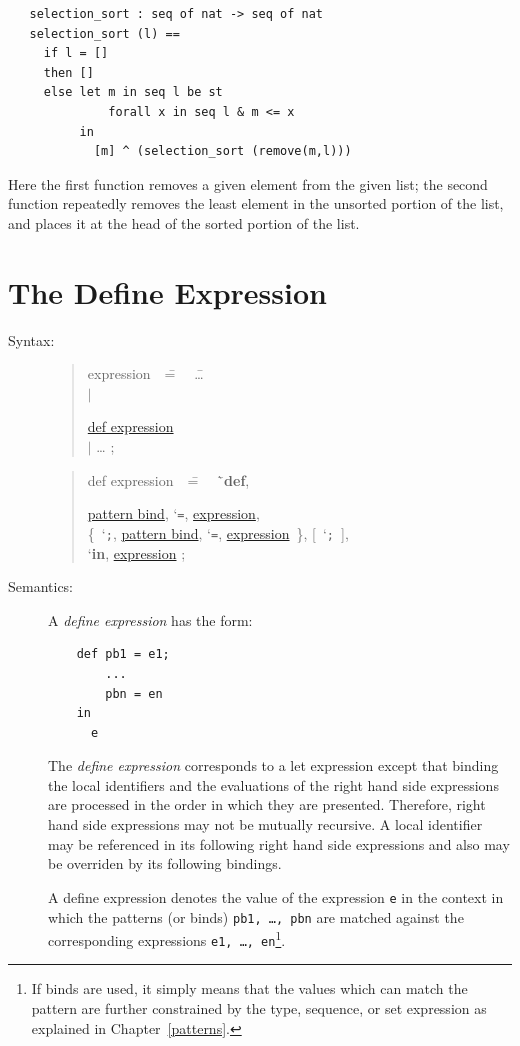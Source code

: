 \documentclass{overturerepchap}
\newcommand{\Lit}[1]{`{\tt #1}\Quote}
\newcommand{\Rule}[2]{
  \begin{quote}\begin{tabbing}
    #1\index{#1}\ \ \= = \ \ \= #2  ; %

  \end{tabbing}\end{quote}
  }
\newcommand{\Ruleref}[1]{
  \hyperlink{rule:#1}{#1}}
\newcommand{\SeqPt}[1]{\{\ #1\ \}}
\newcommand{\lfeed}{\\ \> \>}
\newcommand{\dsep}{\\ \> $|$ \>}
\newcommand{\Lop}[1]{`{\bf\ttfamily #1}\Quote}
\newcommand{\OptPt}[1]{[\ #1\ ]}
\begin{document}
{\begin{description}
\begin{lstlisting}
   selection_sort : seq of nat -> seq of nat
   selection_sort (l) ==
     if l = []
     then []
     else let m in seq l be st
              forall x in seq l & m <= x
          in
            [m] ^ (selection_sort (remove(m,l)))
   \end{lstlisting}
\label{selectionSortdef}
   Here the first function removes a given element from the given
   list; the second function repeatedly removes the least element in
   the unsorted portion of the list, and places it at the head of the
   sorted portion of the list.
\end{description}

\section{The Define Expression} \label{define-exp}

\begin{description}
\item[Syntax:]
  \Rule{expression}{
    \ldots \dsep
    \Ruleref{def expression} \dsep
    \ldots
    }

\Rule{def expression}{
  \Lop{def},
  \Ruleref{pattern bind}, \Lit{=}, \Ruleref{expression}, \lfeed
  \SeqPt{\Lit{;}, \Ruleref{pattern bind}, \Lit{=}, \Ruleref{expression}}, \OptPt{\Lit{;}},
  \lfeed
  \Lop{in}, \Ruleref{expression}
  }

\item[Semantics:] A {\it define expression} has the form:
  \begin{lstlisting}
    def pb1 = e1;
        ...
        pbn = en
    in
      e
  \end{lstlisting}
  The {\it define expression} corresponds to a let expression except
  that binding the local identifiers and the evaluations of the right hand side
  expressions are processed in the order in which they are presented. 
  Therefore,  right hand side expressions may not be mutually recursive.
  A local identifier may be referenced in its following right hand side expressions
  and also may be overriden by its following bindings.

  A define expression denotes the value of the expression {\tt e} in the
  context in which the patterns (or binds) {\tt pb1, \ldots, pbn} are
  matched against the corresponding expressions {\tt e1, \ldots,
  en}\footnote{If binds are used, it simply means that the values
  which can match the pattern are further constrained by the type, sequence, or
  set expression as explained in Chapter~\ref{patterns}.}.


\end{description}}
\end{document}

